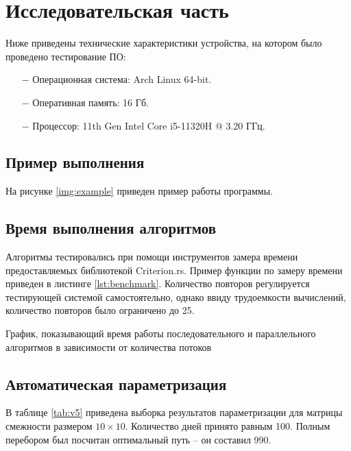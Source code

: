 \chapter{Исследовательская часть}
Ниже приведены технические характеристики устройства, на котором было проведено тестирование ПО:

\begin{itemize}
    \item[$-$] Операционная система: Arch Linux \cite{arch} 64-bit.
    \item[$-$] Оперативная память: 16 Гб.
    \item[$-$] Процессор: 11th Gen Intel\textsuperscript{\tiny\textregistered} Core\textsuperscript{\tiny\texttrademark} i5-11320H @ 3.20 ГГц\cite{i5}.
\end{itemize}

\section{Пример выполнения}
На рисунке \ref{img:example} приведен пример работы программы.
\clearpage

\section{Время выполнения алгоритмов}
Алгоритмы тестировались при помощи инструментов замера времени предоставляемых библиотекой Criterion.rs\cite{Criterion}.
Пример функции по замеру времени приведен в листинге \ref{lst:benchmark}.
Количество повторов регулируется тестирующей системой самостоятельно, однако ввиду трудоемкости вычислений, количество повторов было ограничено до 25.


\newpage
График, показывающий время работы последовательного и параллельного алгоритмов в зависимости от количества потоков\newline

 \newpage


\section{Автоматическая параметризация}

В таблице \ref{tab:v5} приведена выборка результатов параметризации для матрицы смежности размером $10\times10$. Количество дней принято равным 100. Полным перебором был посчитан оптимальный путь -- он составил 990.

